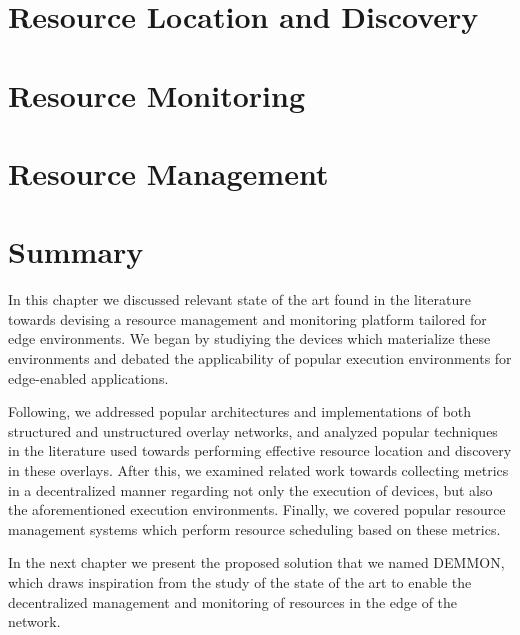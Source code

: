 \section{Resource Location and Discovery} \label{sec:res_location} 

\section{Resource Monitoring} \label{sec:res_monitoring} 

\section{Resource Management} \label{sec:res_management} 

\section{Summary}

In this chapter we discussed relevant state of the art found in the literature towards devising a resource management and monitoring platform tailored for edge environments. We began by studiying the devices which materialize these environments and debated the applicability of popular execution environments for edge-enabled applications.

Following, we addressed popular architectures and implementations of both structured and unstructured overlay networks, and analyzed popular techniques in the literature used towards performing effective resource location and discovery in these overlays. After this, we examined related work towards collecting metrics in a decentralized manner regarding not only the execution of devices, but also the aforementioned execution environments. Finally, we covered popular resource management systems which perform resource scheduling based on these metrics.

In the next chapter we present the proposed solution that we named DEMMON, which draws inspiration from the study of the state of the art to enable the decentralized management and monitoring of resources in the edge of the network.